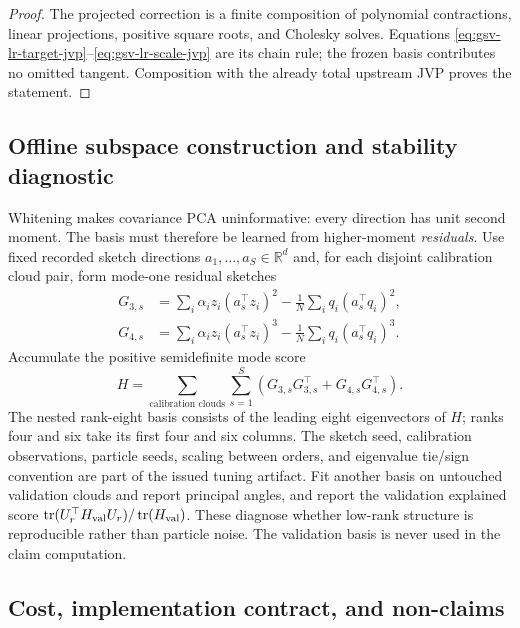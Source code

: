 \documentclass[11pt]{article}
\theoremstyle{definition}
\theoremstyle{remark}
\begin{document}
\begin{proof}
The projected correction is a finite composition of polynomial contractions,
linear projections, positive square roots, and Cholesky solves.  Equations
\eqref{eq:gsv-lr-target-jvp}--\eqref{eq:gsv-lr-scale-jvp} are its chain rule;
the frozen basis contributes no omitted tangent.  Composition with the
already total upstream JVP proves the statement.
\end{proof}

\subsection{Offline subspace construction and stability diagnostic}

Whitening makes covariance PCA uninformative: every direction has unit
second moment.  The basis must therefore be learned from higher-moment
\emph{residuals}.  Use fixed recorded sketch directions
$a_1,\ldots,a_S\in\mathbb R^d$ and, for each disjoint calibration cloud pair,
form mode-one residual sketches
\begin{align}
 G_{3,s}&=\sum_i\alpha_i z_i(a_s^\top z_i)^2
 -\frac1N\sum_iq_i(a_s^\top q_i)^2,\\
 G_{4,s}&=\sum_i\alpha_i z_i(a_s^\top z_i)^3
 -\frac1N\sum_iq_i(a_s^\top q_i)^3.
 \label{eq:gsv-lr-sketches}
\end{align}
Accumulate the positive semidefinite mode score
\begin{equation}
 H=\sum_{\text{calibration clouds}}\sum_{s=1}^S
 \left(G_{3,s}G_{3,s}^\top+G_{4,s}G_{4,s}^\top\right).
 \label{eq:gsv-lr-mode-score}
\end{equation}
The nested rank-eight basis consists of the leading eight eigenvectors of
$H$; ranks four and six take its first four and six columns.  The sketch seed,
calibration observations, particle seeds, scaling between orders, and
eigenvalue tie/sign convention are part of the issued tuning artifact.
Fit another basis on untouched validation clouds and report principal angles,
and report the validation explained score
$\operatorname{tr}(U_r^\top H_{\rm val}U_r)/
\operatorname{tr}(H_{\rm val})$.  These diagnose whether low-rank structure
is reproducible rather than particle noise.  The validation basis is never
used in the claim computation.

\subsection{Cost, implementation contract, and non-claims}
\end{document}

